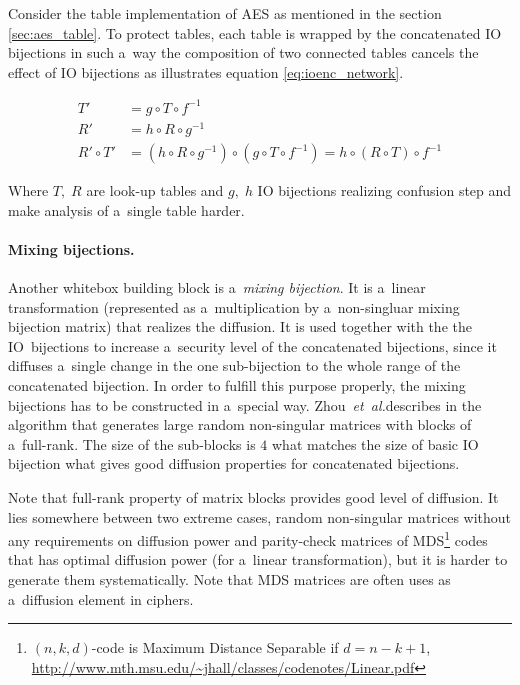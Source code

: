\documentclass[11pt,oneside,final]{fithesis2}
\newcommand{\eal}{\emph{et~al.}}
\begin{document}
    Consider the table implementation of AES as mentioned in the section \ref{sec:aes_table}. To protect tables, each table is wrapped by
    the concatenated IO bijections in such a~way the composition of two connected tables cancels the effect of IO bijections as illustrates  
    equation \ref{eq:ioenc_network}.
    
    \begin{subequations}\label{eq:ioenc_network}
    \begin{align}
        T' &= g \circ T \circ f^{-1} \\
        R' &= h \circ R \circ g^{-1} \\
        R' \circ T' &= \left(h \circ R \circ g^{-1}\right) \circ \left(g \circ T \circ f^{-1}\right) = h \circ (R \circ T) \circ f^{-1}
    \end{align}
    \end{subequations}
    
    Where $T,\; R$ are look-up tables and $g,\; h$ IO bijections realizing confusion step and make analysis of a~single table harder.
    
    \paragraph*{Mixing bijections.}
    Another whitebox building block is a~\emph{mixing bijection}. It is a~linear transformation (represented as a~multiplication by a~non-singluar mixing bijection matrix)
    that realizes the diffusion. It is used together with the the IO~bijections to increase a~security level of the concatenated bijections, since it diffuses a~single change
    in the one sub-bijection to the whole range of the concatenated bijection. In order to fulfill this purpose properly, the mixing bijections has to be constructed
    in a~special way. Zhou~\eal describes in \citep{journals/iacr/XiaoZ02} the algorithm that generates large random non-singular matrices with blocks of a~full-rank.
    The size of the sub-blocks is $4$ what matches the size of basic IO bijection what gives good diffusion properties for concatenated bijections. 
    
    Note that full-rank property of matrix blocks provides good level of diffusion. It lies somewhere between two extreme cases, random non-singular matrices without any
    requirements on diffusion power and parity-check matrices of MDS\footnote{$(n, k, d)$-code is Maximum Distance Separable if $d=n-k+1$, \url{http://www.mth.msu.edu/~jhall/classes/codenotes/Linear.pdf}} 
    codes that has optimal diffusion power (for a~linear transformation), but it is harder to generate them systematically. Note that MDS matrices are often uses 
    as a~diffusion element in ciphers.
    
\end{document}
